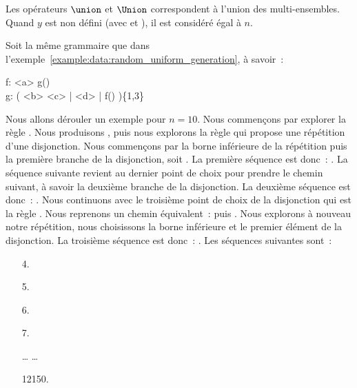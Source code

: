 Les opérateurs $\union$ et $\Union$ correspondent à l'union des multi-ensembles.
Quand $y$ est non défini (avec \code{*} et \code{+}), il est considéré égal à
$n$.

\begin{example}
\label{example:data:bounded_exhaustive_generation}

Soit la même grammaire que dans
l'exemple~\ref{example:data:random_uniform_generation}, à savoir~:

\begin{pre}
f: <a> g() \\
g: ( <b> <c> | <d> | f() )\{1,3\}
\end{pre}

Nous allons dérouler un exemple pour $n = 10$. Nous commençons par explorer la
règle . Nous produisons , puis nous explorons la règle
 qui propose une répétition d'une disjonction.  Nous commençons par la
borne inférieure de la répétition puis la première branche de la disjonction,
soit . La première séquence est donc~: . La
séquence suivante revient au dernier point de choix pour prendre le chemin
suivant, à savoir la deuxième branche de la disjonction. La deuxième séquence
est donc~: . Nous continuons avec le troisième point de choix de
la disjonction qui est la règle . Nous reprenons un chemin équivalent~:
 puis . Nous explorons à nouveau notre répétition, nous
choisissons la borne inférieure et le premier élément de la disjonction. La
troisième séquence est donc~: . Les séquences suivantes
sont~:

\begin{enumerate}

\item[\phantom{0000}4.] 

\item[\phantom{0000}5.] 

\item[\phantom{0000}6.] 

\item[\phantom{0000}7.] 

\item[\phantom{000}…] …

\item[12150.] 

\end{enumerate}

\end{example}

